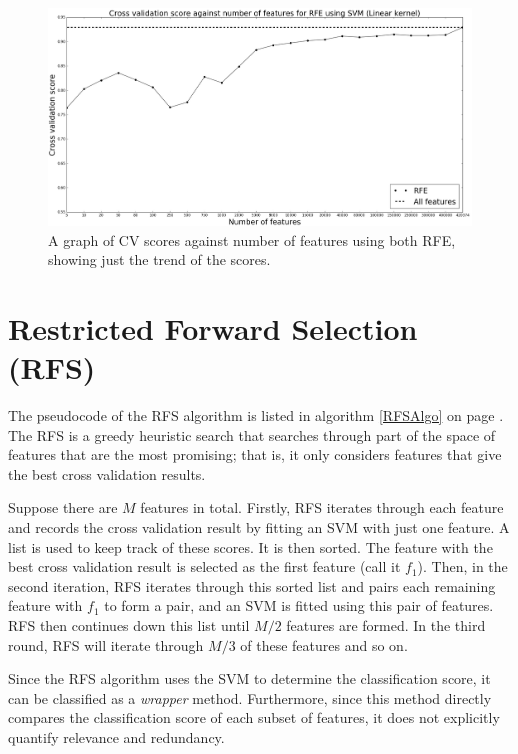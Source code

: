 \documentclass[12pt, twoside, a4paper]{report}
\begin{document}
\begin{figure}
\centering
\includegraphics[width=\textwidth]{images/rfe_linear.jpeg}
\caption{A graph of CV scores against number of features using both RFE, showing just the trend of the scores.}
\label{body:rfe:graph_1}
\end{figure}


\section{Restricted Forward Selection (RFS)} \label{body:rfs}

The pseudocode of the RFS algorithm \cite{deng1998omega} is listed in algorithm \ref{RFSAlgo} on page \pageref{RFSAlgo}. The RFS is a greedy heuristic search that searches through part of the space of features that are the most promising; that is, it only considers features that give the best cross validation results.

Suppose there are $M$ features in total. Firstly, RFS iterates through each feature and records the cross validation result by fitting an SVM with just one feature. A list is used to keep track of these scores. It is then sorted. The feature with the best cross validation result is selected as the first feature (call it $f_1$). Then, in the second iteration, RFS iterates through this sorted list and pairs each remaining feature with $f_1$ to form a pair, and an SVM is fitted using this pair of features. RFS then continues down this list until $M/2$ features are formed. In the third round, RFS will iterate through $M/3$ of these features and so on.

Since the RFS algorithm uses the SVM to determine the classification score, it can be classified as a \textit{wrapper} method. Furthermore, since this method directly compares the classification score of each subset of features, it does not explicitly quantify relevance and redundancy.
\end{document}
